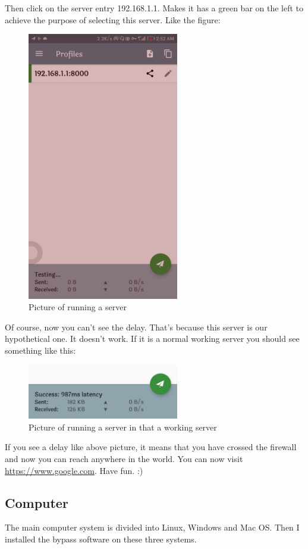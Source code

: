 \documentclass[12pt]{wx672article}
\begin{document}
\begin{itemize}
Then click on the server entry 192.168.1.1. Makes it has a green bar on the left to
achieve the purpose of selecting this server. Like the figure:
\begin{figure}[!htb]
\centering
\includegraphics[width=250px]{./images/androidPhone6.jpg}
\caption{\label{fig:org19aa39b}
Picture of running a server}
\end{figure}

Of course, now you can't see the delay. That's because this server is our hypothetical
one. It doesn't work. If it is a normal working server you should see something like this:
\begin{figure}[!htb]
\centering
\includegraphics[width=250px]{./images/androidPhone7.jpg}
\caption{\label{fig:org3b18a69}
Picture of running a server in that a working  server}
\end{figure}

If you see a delay like above picture, it means that you have crossed the firewall and now
you can reach anywhere in the world. You can now visit \url{https://www.google.com}. Have
fun. :)
\end{itemize}

\subsection*{Computer}
\label{sec:org482f6e0}
The main computer system is divided into Linux, Windows and Mac OS. Then I installed the
bypass software on these three systems.
\end{document}
